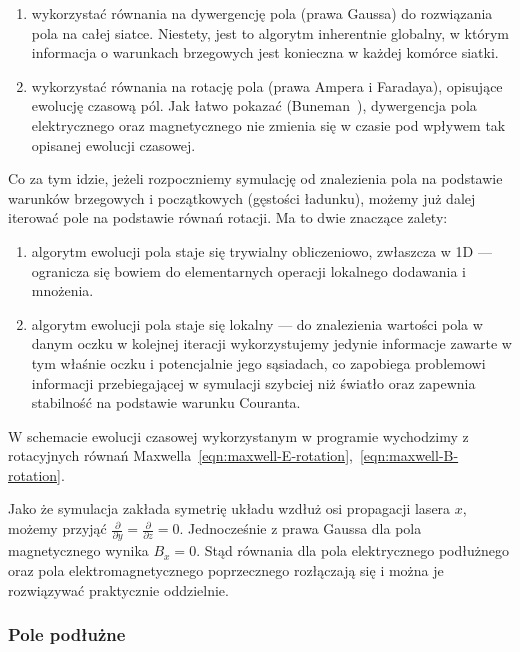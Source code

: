 \begin{enumerate}
    \item wykorzystać równania na dywergencję pola (prawa Gaussa) do
    rozwiązania pola na całej siatce. Niestety, jest to algorytm
    inherentnie globalny, w którym informacja o warunkach brzegowych
    jest konieczna w każdej komórce siatki.

    \item wykorzystać równania na rotację pola (prawa Ampera i Faradaya),
    opisujące ewolucję czasową pól. Jak łatwo pokazać (Buneman~\cite{bunemanvillasenor}), dywergencja
    pola elektrycznego oraz magnetycznego nie zmienia się w czasie pod
    wpływem tak opisanej ewolucji czasowej.
\end{enumerate}

Co za tym idzie, jeżeli rozpoczniemy symulację od znalezienia pola na
podstawie warunków brzegowych i początkowych (gęstości ładunku), możemy już
dalej iterować pole na podstawie równań rotacji. Ma to dwie znaczące
zalety:

\begin{enumerate}
\item algorytm ewolucji pola staje się trywialny obliczeniowo,
zwłaszcza w 1D --- ogranicza się bowiem do elementarnych operacji lokalnego
dodawania i mnożenia.

\item algorytm ewolucji pola staje się lokalny --- do
znalezienia wartości pola w danym oczku w kolejnej iteracji wykorzystujemy
jedynie informacje zawarte w tym właśnie oczku i potencjalnie jego
sąsiadach, co zapobiega
problemowi informacji przebiegającej w symulacji szybciej niż światło oraz
zapewnia stabilność na podstawie warunku Couranta.
\end{enumerate}

W schemacie ewolucji czasowej wykorzystanym w programie wychodzimy z rotacyjnych równań Maxwella~\ref{eqn:maxwell-E-rotation},~\ref{eqn:maxwell-B-rotation}.

Jako że symulacja zakłada symetrię układu wzdłuż osi propagacji lasera $x$,
możemy przyjąć $\frac{\partial}{\partial y} = \frac{\partial}{\partial z} =
0 $.  Jednocześnie z prawa Gaussa dla pola magnetycznego wynika $B_x = 0$.
Stąd równania dla pola elektrycznego podłużnego oraz pola
elektromagnetycznego poprzecznego rozłączają się i można je rozwiązywać praktycznie oddzielnie.

\subsubsection{Pole podłużne}

